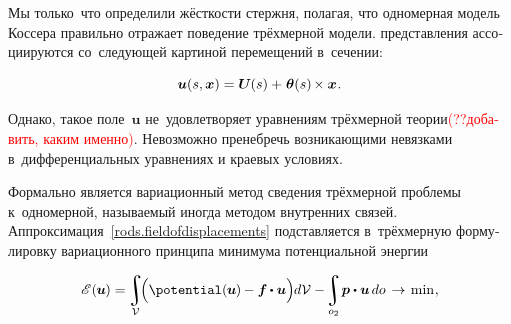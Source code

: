 \begin{otherlanguage}{russian}

Мы только~что определили жёсткости стержня, полагая, что одномерная модель Коссера правильно отражает поведение трёхмерной модели.  представления ассоциируются со~следующей картиной перемещений в~сечении:

\nopagebreak\vspace{-0.1em}\begin{equation}\label{rods.fieldofdisplacements}
\bm{u}(s,\bm{x}) = \bm{U}\hspace{-0.1ex}(s) + \hspace{.15ex} \bm{\theta}(s) \hspace{-0.2ex} \times \bm{x} \hspace{.12ex} .
\end{equation}

\vspace{-0.1em}\noindent
Однако, такое поле~$\bm{u}$ не~удовлетворяет уравнениям трёхмерной теории\textcolor{red}{(??добавить, каким именно)}.
Невозможно пренебречь возникающими невязками в~дифференциальных уравнениях и краевых условиях.

Формально  является вариационный метод сведения трёхмерной проблемы к~одномерной, называемый иногда методом внутренних связей.
Аппроксимация~\eqref{rods.fieldofdisplacements} подставляется в~трёхмерную формулировку вариационного принципа минимума потенциальной энергии~

\nopagebreak\vspace{-0.1em}\begin{equation*}
\potentialenergyfunctional \hspace{.2ex} (\hspace{-0.1ex}\bm{u}\hspace{-0.1ex}) = \hspace{-0.2ex}
\displaystyle\integral\displaylimits_{\mathcal{V}} \hspace{-0.5ex}
\Bigl(
\potential(\hspace{-0.1ex}\bm{u}\hspace{-0.1ex}) \hspace{-0.1ex} - \bm{f} \hspace{-0.1ex} \dotp \bm{u} \Bigr) \hspace{-0.1ex} d\mathcal{V}
- \hspace{-0.3ex}
\displaystyle\integral\displaylimits_{o_2} \hspace{-0.32ex} \bm{p} \dotp \bm{u} \hspace{.33ex} do \hspace{.2ex}
\hspace{.1ex}\to\hspace{.25ex} \mathrm{min} \hspace{.1ex} ,
\end{equation*}


\end{otherlanguage}

